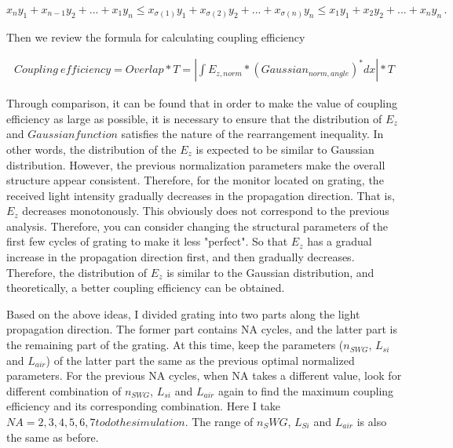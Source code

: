 \documentclass[]{article}
\begin{document}
$$x_ny_1 + x_{n-1}y_2 + ... + x_1y_n \leq x_{\sigma (1)}y_1 + x_{\sigma (2)}y_2 + ... + x_{\sigma (n)}y_n \leq x_1y_1 + x_2y_2 + ... + x_ny_n \, .$$

Then we review the formula for calculating coupling efficiency

\begin{align*}
	Coupling \ efficiency = Overlap*T = |\int E_{z,norm} * (Gaussian_{norm,angle})^*dx|*T
\end{align*}


Through comparison, it can be found that in order to make the value of coupling efficiency as large as possible, it is necessary to ensure that the distribution of $E_z$ and $Gaussian function$ satisfies the nature of the rearrangement inequality. In other words, the distribution of the $E_z$ is expected to be similar to Gaussian distribution. However, the previous normalization parameters make the overall structure appear consistent. Therefore, for the monitor located on grating, the received light intensity gradually decreases in the propagation direction. That is, $E_z$ decreases monotonously. This obviously does not correspond to the previous analysis. Therefore, you can consider changing the structural parameters of the first few cycles of grating to make it less "perfect". So that $E_z$ has a gradual increase in the propagation direction first, and then gradually decreases. Therefore, the distribution of $E_z$ is similar to the Gaussian distribution, and theoretically, a better coupling efficiency can be obtained.

Based on the above ideas, I divided grating into two parts along the light propagation direction. The former part contains NA cycles, and the latter part is the remaining part of the grating. At this time, keep the parameters ($n_{SWG}$, $L_{si}$ and $L_{air}$) of the latter part the same as the previous optimal normalized parameters. For the previous NA cycles, when NA takes a different value, look for different combination of $n_{SWG}$, $L_{si}$ and $L_{air}$ again to find the maximum coupling efficiency and its corresponding combination. Here I take $NA = 2, 3, 4, 5, 6, 7 to do the simulation$. The range of $n_SWG$, $L_{Si}$ and $L_{air}$ is also the same as before.    

\hspace*{\fill} 
\end{document}
